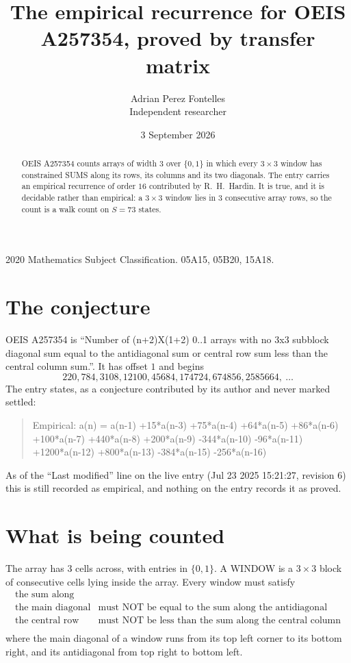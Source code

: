 \documentclass[11pt,a4paper]{article}
\title{The empirical recurrence for OEIS A257354, proved by transfer matrix}
\author{Adrian Perez Fontelles\\ \small Independent researcher}
\date{3 September 2026}
\theoremstyle{plain}
\theoremstyle{definition}
\begin{document}
\maketitle

\begin{abstract}
OEIS A257354 counts arrays of width $3$ over $\{0,1\}$ in which every $3\times3$ window has
constrained SUMS along its rows, its columns and its two diagonals. The entry carries an
empirical recurrence of order $16$ contributed by R.~H.~Hardin. It is true, and it is
decidable rather than empirical: a $3\times3$ window lies in $3$ consecutive array rows,
so the count is a walk count on $S=73$ states.
\end{abstract}

\noindent\small 2020 Mathematics Subject Classification. 05A15, 05B20, 15A18.\normalsize

\section{The conjecture}

OEIS A257354 is ``Number of (n+2)X(1+2) 0..1 arrays with no 3x3 subblock diagonal sum equal to the antidiagonal sum or central row sum less than the central column sum.''. It has offset $1$ and begins
\[
220, 784, 3108, 12100, 45684, 174724, 674856, 2585664,\ \dots
\]
The entry states, as a conjecture contributed by its author and never marked settled:
\begin{quote}
Empirical: a(n) = a(n-1) +15*a(n-3) +75*a(n-4) +64*a(n-5) +86*a(n-6) +100*a(n-7) +440*a(n-8) +200*a(n-9) -344*a(n-10) -96*a(n-11) +1200*a(n-12) +800*a(n-13) -384*a(n-15) -256*a(n-16)
\end{quote}
As of the ``Last modified'' line on the live entry (Jul 23 2025 15:21:27, revision 6) this is still
recorded as empirical, and nothing on the entry records it as proved.

\section{What is being counted}

The array has $3$ cells across, with entries in $\{0,1\}$. A WINDOW is a $3\times3$ block
of consecutive cells lying inside the array. Every window must satisfy
\[
\begin{array}{ll}
\text{the sum along} & \text{} \\[2pt]
\text{the main diagonal} & \text{must NOT be equal to the sum along the antidiagonal} \\
\text{the central row} & \text{must NOT be less than the sum along the central column} \\
\end{array}
\]
where the main diagonal of a window runs from its top left corner to its bottom right, and its
antidiagonal from top right to bottom left.
\end{document}
